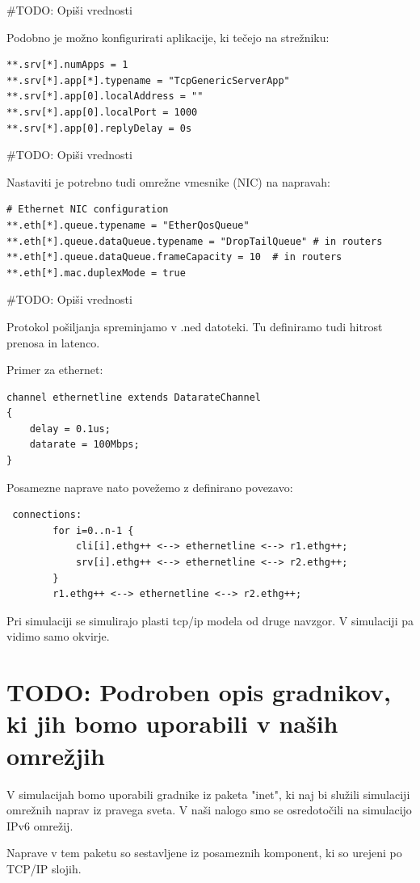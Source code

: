 \documentclass[11pt,a4paper,slovene]{myarticle}
\begin{document}
#TODO: Opiši vrednosti

Podobno je možno konfigurirati aplikacije, ki tečejo na strežniku:
\begin{lstlisting}
**.srv[*].numApps = 1
**.srv[*].app[*].typename = "TcpGenericServerApp"
**.srv[*].app[0].localAddress = ""
**.srv[*].app[0].localPort = 1000
**.srv[*].app[0].replyDelay = 0s
\end{lstlisting}

#TODO: Opiši vrednosti

Nastaviti je potrebno tudi omrežne vmesnike (NIC) na napravah:
\begin{lstlisting}
# Ethernet NIC configuration
**.eth[*].queue.typename = "EtherQosQueue"
**.eth[*].queue.dataQueue.typename = "DropTailQueue" # in routers
**.eth[*].queue.dataQueue.frameCapacity = 10  # in routers
**.eth[*].mac.duplexMode = true
\end{lstlisting}

#TODO: Opiši vrednosti

Protokol pošiljanja spreminjamo v .ned datoteki. Tu definiramo tudi hitrost prenosa in latenco.

Primer za ethernet:
\begin{lstlisting}
channel ethernetline extends DatarateChannel
{
    delay = 0.1us;
    datarate = 100Mbps;
}
\end{lstlisting}

Posamezne naprave nato povežemo z definirano povezavo:
\begin{lstlisting}
 connections:
        for i=0..n-1 {
            cli[i].ethg++ <--> ethernetline <--> r1.ethg++;
            srv[i].ethg++ <--> ethernetline <--> r2.ethg++;
        }
        r1.ethg++ <--> ethernetline <--> r2.ethg++;
\end{lstlisting}

Pri simulaciji se simulirajo plasti tcp/ip modela od druge navzgor. V simulaciji pa vidimo samo okvirje.


\section{TODO: Podroben opis gradnikov, ki jih bomo uporabili v naših omrežjih}
V simulacijah bomo uporabili gradnike iz paketa "inet", ki naj bi služili simulaciji omrežnih naprav iz pravega sveta. V naši nalogo smo se osredotočili na simulacijo IPv6 omrežij.

Naprave v tem paketu so sestavljene iz posameznih komponent, ki so urejeni po TCP/IP slojih.
\end{document}
